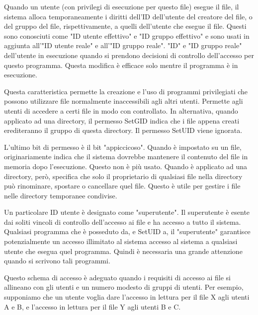 Quando un utente (con privilegi di esecuzione per questo file) esegue il file, il sistema alloca temporaneamente i diritti dell'ID dell'utente del creatore del file, o del gruppo del file, rispettivamente, a quelli dell'utente che esegue il file. Questi sono conosciuti come "ID utente effettivo" e "ID gruppo effettivo" e sono usati in aggiunta all'"ID utente reale" e all'"ID gruppo reale". "ID" e "ID gruppo reale" dell'utente in esecuzione quando si prendono decisioni di controllo dell'accesso per questo programma. Questa modifica è efficace solo mentre il programma è in esecuzione.

\singlespacing

Questa caratteristica permette la creazione e l'uso di programmi privilegiati che possono utilizzare file normalmente inaccessibili agli altri utenti. Permette agli utenti di accedere a certi file in modo con controllato. In alternativa, quando applicato ad una directory, il permesso SetGID indica che i file appena creati erediteranno il gruppo di questa directory. Il permesso SetUID viene ignorata.

\singlespacing

L'ultimo bit di permesso è il bit "appiccicoso". Quando è impostato su un file, originariamente indica che il sistema dovrebbe mantenere il contenuto del file in memoria dopo l'esecuzione. Questo non è più usato. Quando è applicato ad una directory, però, specifica che solo il proprietario di qualsiasi file nella directory può rinominare, spostare o cancellare quel file. Questo è utile per gestire i file nelle directory temporanee condivise.

\singlespacing

Un particolare ID utente è designato come "superutente". Il superutente è esente dai soliti vincoli di controllo dell'accesso ai file e ha accesso a tutto il sistema. Qualsiasi programma che è posseduto da, e SetUID a, il "superutente" garantisce potenzialmente un accesso illimitato al sistema accesso al sistema a qualsiasi utente che esegua quel programma. Quindi è necessaria una grande attenzione quando si scrivono tali programmi.

\singlespacing

Questo schema di accesso è adeguato quando i requisiti di accesso ai file si allineano con gli utenti e un numero modesto di gruppi di utenti. Per esempio, supponiamo che un utente voglia dare l'accesso in lettura per il file X agli utenti A e B, e l'accesso in lettura per il file Y agli utenti B e C.


